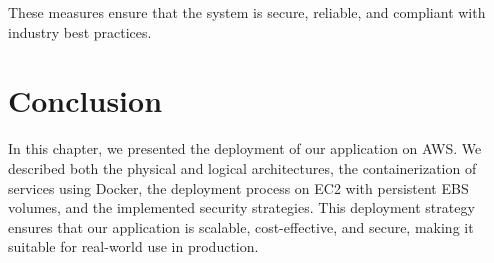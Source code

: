 These measures ensure that the system is secure, reliable, and
compliant with industry best practices.

\section*{Conclusion}
In this chapter, we presented the deployment of our application on
AWS. We described both the physical and logical architectures, the
containerization of services using Docker, the deployment process on
EC2 with persistent EBS volumes, and the implemented security
strategies. This deployment strategy ensures that our application is
scalable, cost-effective, and secure, making it suitable for real-world
use in production.   

